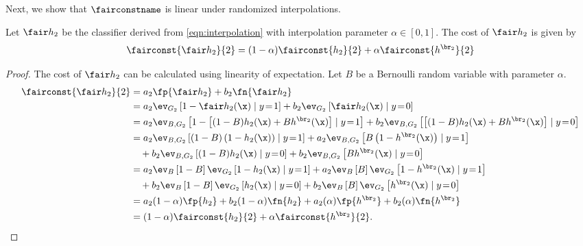 Next, we show that $\fairconstname$ is linear under randomized interpolations.
\begin{lemma} \label{lma:interpolation}
  Let $\fair h_2$ be the classifier derived from \eqref{eqn:interpolation}
  with interpolation parameter $\alpha \in [0, 1]$.
  The cost of $\fair h_2$ is given by
  \[
    \fairconst{\fair h_2}{2} = (1 - \alpha) \fairconst{h_2}{2} + \alpha \fairconst{h^{\br_2}}{2}
  \]
\end{lemma}
%
\begin{proof}
  The cost of $\fair h_2$ can be calculated using linearity of expectation. Let
  $B$ be a Bernoulli random variable with parameter $\alpha$.
  \begin{align*}
    \fairconst{\fair h_2}{2} &= a_2 \fp{\fair h_2} + b_2 \fn{\fair h_2}
    \\&= a_2 \ev_{G_2} \left[ 1 -  \fair h_2(\x) \mid y\!=\!1 \right] + b_2 \ev_{G_2} \left[ \fair h_2(\x) \mid y\!=\!0 \right]
    \\&= a_2 \ev_{B,G_2} \left[ 1 - \left[ (1-B) h_2(\x) + B h^{\br_2}(\x) \right] \mid y\!=\!1 \right]
    + b_2 \ev_{B,G_2} \left[ \left[ (1-B) h_2(\x) + B h^{\br_2}(\x) \right] \mid y\!=\!0 \right]
    \\&=                a_2 \ev_{B,G_2} \left[ (1-B) \left( 1 - h_2(\x) \right) \mid y\!=\!1 \right]
    + a_2 \ev_{B,G_2} \left[ B \left( 1 -  h^{\br_2}(\x) \right) \mid y\!=\!1 \right]
    \\&\phantom{=} \:
    + b_2 \ev_{B,G_2} \left[ (1-B) h_2(\x) \mid y\!=\!0 \right]
    + b_2 \ev_{B,G_2} \left[ B h^{\br_2}(\x) \mid y\!=\!0 \right]
    \\&=                a_2 \ev_{B} \left[ 1-B \right] \ev_{G_2} \left[ 1 - h_2(\x) \mid y\!=\!1 \right]
    + a_2 \ev_{B} \left[ B \right]   \ev_{G_2} \left[ 1 -  h^{\br_2}(\x) \mid y\!=\!1 \right]
    \\&\phantom{=} \:
    + b_2 \ev_{B} \left[ 1-B \right] \ev_{G_2} \left[ h_2(\x) \mid y\!=\!0 \right]
    + b_2 \ev_{B} \left[ B \right]   \ev_{G_2} \left[ h^{\br_2}(\x) \mid y\!=\!0 \right]
    \\&= a_2 (1-\alpha) \fp{h_2} + b_2 (1-\alpha) \fn{h_2}
    + a_2 (\alpha) \fp{h^{\br_2}} + b_2 (\alpha) \fn{h^{\br_2}}
    \\&= (1 - \alpha) \fairconst{h_2}{2} + \alpha \fairconst{h^{\br_2}}{2}.
  \end{align*}
\end{proof}
